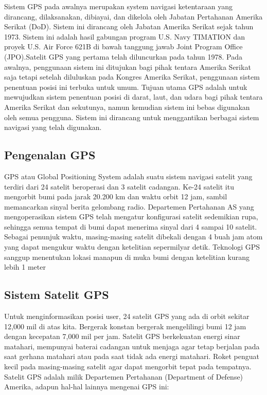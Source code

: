 Sistem GPS pada awalnya merupakan system navigasi ketentaraan yang dirancang, dilaksanakan, dibiayai, dan dikelola oleh Jabatan Pertahanan Amerika Serikat (DoD). Sistem ini dirancang oleh Jabatan Amerika Serikat sejak tahun 1973. Sistem ini adalah hasil gabungan program U.S. Navy TIMATION dan proyek U.S. Air Force 621B di bawah tanggung jawab Joint Program Office (JPO).Satelit GPS yang pertama telah diluncurkan pada tahun 1978. Pada awalnya, penggunaan sistem ini ditujukan bagi pihak tentara Amerika Serikat saja tetapi setelah diluluskan pada Kongres Amerika Serikat, penggunaan sistem penentuan posisi ini terbuka untuk umum. Tujuan utama GPS adalah untuk mewujudkan sistem penentuan posisi di darat, laut, dan udara bagi pihak tentara Amerika Serikat dan sekutunya, namun kemudian sistem ini bebas digunakan oleh semua pengguna. Sistem ini dirancang untuk menggantikan berbagai sistem navigasi yang telah digunakan.

\subsection{Pengenalan GPS}
GPS atau Global Positioning System adalah suatu sistem navigasi satelit yang terdiri dari 24 satelit beroperasi dan 3 satelit cadangan. Ke-24 satelit itu mengorbit bumi pada jarak 20.200 km dan waktu orbit 12 jam, sambil memancarkan sinyal berita gelombang radio. Departemen Pertahanan AS yang mengoperasikan sistem GPS telah mengatur konfigurasi satelit sedemikian rupa, sehingga semua tempat di bumi dapat menerima sinyal dari 4 sampai 10 satelit. Sebagai penunjuk waktu, masing-masing satelit dibekali dengan 4 buah jam atom yang dapat mengukur waktu dengan ketelitian sepermilyar detik. Teknologi GPS sanggup menentukan lokasi manapun di muka bumi dengan ketelitian kurang lebih 1 meter

\subsection{Sistem Satelit GPS}
Untuk menginformasikan posisi user, 24 satelit GPS yang ada di orbit sekitar 12,000 mil di atas kita. Bergerak konstan bergerak mengelilingi bumi 12 jam dengan kecepatan 7,000 mil per jam. Satelit GPS berkekuatan energi sinar matahari, mempunyai baterai cadangan untuk menjaga agar tetap berjalan pada saat gerhana matahari atau pada saat tidak ada energi matahari. Roket penguat kecil pada masing-masing satelit agar dapat mengorbit tepat pada tempatnya.
Satelit GPS adalah milik Departemen Pertahanan (Department of Defense) Amerika, adapun hal-hal lainnya mengenai GPS ini:

